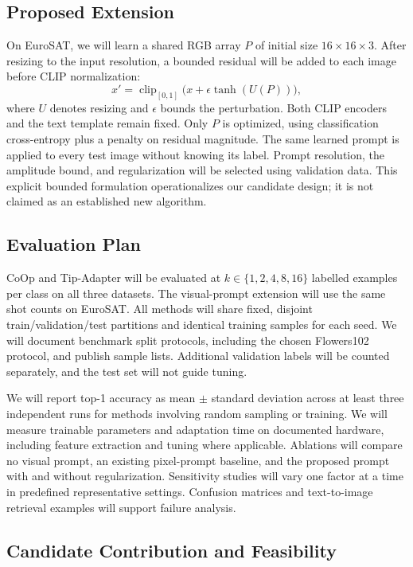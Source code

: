 \documentclass[11pt,letterpaper]{article}
\begin{document}
\subsection{Proposed Extension}

On EuroSAT, we will learn a shared RGB array $P$ of initial size $16\times16\times3$. After resizing to the input resolution, a bounded residual will be added to each image before CLIP normalization:
\[
 x' = \operatorname{clip}_{[0,1]}\bigl(x + \epsilon\tanh(U(P))\bigr),
\]
where $U$ denotes resizing and $\epsilon$ bounds the perturbation. Both CLIP encoders and the text template remain fixed. Only $P$ is optimized, using classification cross-entropy plus a penalty on residual magnitude. The same learned prompt is applied to every test image without knowing its label. Prompt resolution, the amplitude bound, and regularization will be selected using validation data. This explicit bounded formulation operationalizes our candidate design; it is not claimed as an established new algorithm.

\subsection{Evaluation Plan}

CoOp and Tip-Adapter will be evaluated at $k\in\{1,2,4,8,16\}$ labelled examples per class on all three datasets. The visual-prompt extension will use the same shot counts on EuroSAT. All methods will share fixed, disjoint train/validation/test partitions and identical training samples for each seed. We will document benchmark split protocols, including the chosen Flowers102 protocol, and publish sample lists. Additional validation labels will be counted separately, and the test set will not guide tuning.

We will report top-1 accuracy as mean $\pm$ standard deviation across at least three independent runs for methods involving random sampling or training. We will measure trainable parameters and adaptation time on documented hardware, including feature extraction and tuning where applicable. Ablations will compare no visual prompt, an existing pixel-prompt baseline, and the proposed prompt with and without regularization. Sensitivity studies will vary one factor at a time in predefined representative settings. Confusion matrices and text-to-image retrieval examples will support failure analysis.

\subsection{Candidate Contribution and Feasibility}
\end{document}

